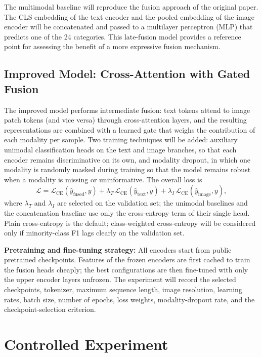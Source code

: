 \documentclass[11pt,a4paper]{article}
\begin{document}
The multimodal baseline will reproduce the fusion approach of the original paper. The CLS embedding of the text encoder and the pooled embedding of the image encoder will be concatenated and passed to a multilayer perceptron (MLP) that predicts one of the 24 categories. This late-fusion model provides a reference point for assessing the benefit of a more expressive fusion mechanism.

\subsection{Improved Model: Cross-Attention with Gated Fusion}

The improved model performs intermediate fusion: text tokens attend to image patch tokens (and vice versa) through cross-attention layers, and the resulting representations are combined with a learned gate that weighs the contribution of each modality per sample. Two training techniques will be added: auxiliary unimodal classification heads on the text and image branches, so that each encoder remains discriminative on its own, and modality dropout, in which one modality is randomly masked during training so that the model remains robust when a modality is missing or uninformative. The overall loss is
\[
\mathcal{L} = \mathcal{L}_{\text{CE}}(\hat{y}_{\text{fused}}, y) + \lambda_{T}\,\mathcal{L}_{\text{CE}}(\hat{y}_{\text{text}}, y) + \lambda_{I}\,\mathcal{L}_{\text{CE}}(\hat{y}_{\text{image}}, y),
\]
where $\lambda_T$ and $\lambda_I$ are selected on the validation set; the unimodal baselines and the concatenation baseline use only the cross-entropy term of their single head. Plain cross-entropy is the default; class-weighted cross-entropy will be considered only if minority-class F1 lags clearly on the validation set.

\textbf{Pretraining and fine-tuning strategy:} All encoders start from public pretrained checkpoints. Features of the frozen encoders are first cached to train the fusion heads cheaply; the best configurations are then fine-tuned with only the upper encoder layers unfrozen. The experiment will record the selected checkpoints, tokenizer, maximum sequence length, image resolution, learning rates, batch size, number of epochs, loss weights, modality-dropout rate, and the checkpoint-selection criterion.

\section{Controlled Experiment}
\end{document}
